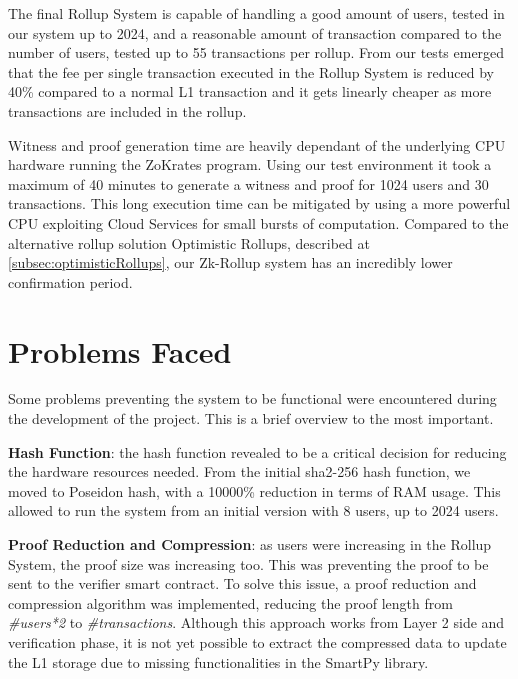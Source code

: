 The final Rollup System is capable of handling a good amount of users, tested in our system up to 2024, and a reasonable amount of transaction compared to the number of users, tested up to 55 transactions per rollup. From our tests emerged that the fee per single transaction executed in the Rollup System is reduced by 40\% compared to a normal L1 transaction and it gets linearly cheaper as more transactions are included in the rollup.

Witness and proof generation time are heavily dependant of the underlying CPU hardware running the ZoKrates program. Using our test environment it took a maximum of 40 minutes to generate a witness and proof for 1024 users and 30 transactions. This long execution time can be mitigated by using a more powerful CPU exploiting Cloud Services for small bursts of computation. Compared to the alternative rollup solution Optimistic Rollups, described at \ref{subsec:optimisticRollups}, our Zk-Rollup system has an incredibly lower confirmation period.



\section{Problems Faced}

Some problems preventing the system to be functional were encountered during the development of the project. This is a brief overview to the most important.

\textbf{Hash Function}: the hash function revealed to be a critical  decision for reducing the hardware resources needed. From the initial sha2-256 hash function, we moved to Poseidon hash, with a 10000\% reduction in terms of RAM usage. This allowed to run the system from an initial version with 8 users, up to 2024 users.

\textbf{Proof Reduction and Compression}: as users were increasing in the Rollup System, the proof size was increasing too. This was preventing the proof to be sent to the verifier smart contract. To solve this issue, a proof reduction and compression algorithm was implemented, reducing the proof length from \textit{\#users*2} to \textit{\#transactions}. Although this approach works from Layer 2 side and verification phase, it is not yet possible to extract the compressed data to update the L1 storage due to missing functionalities in the SmartPy library.

